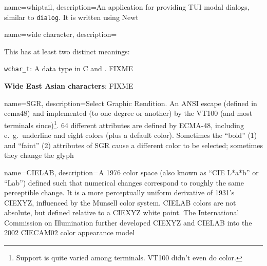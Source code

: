 {
  name={whiptail},
description={An application for providing TUI modal dialogs, similar to \texttt{dialog}. It is written using Newt}
}

{
  name={wide character},
  description={This has at least two distinct meanings:
\begin{denseitemize}
\item \texttt{wchar\_t}: A data type in C and \CC. FIXME
\item \textbf{Wide East Asian characters}: FIXME
\end{denseitemize}
}
}

{
  name={SGR},
    description={Select Graphic Rendition. An ANSI escape (defined in
      \Gls{ecma48}) and implemented (to one degree or another) by the
      VT100\cite{vt100} (and most terminals since)\footnote{Support is quite varied
      among terminals. VT100 didn't even do color.}. 64 different
      attributes are defined by ECMA-48, including e.\ g.\ underline and
      eight colors (plus a default color). Sometimes the ``bold'' (1) and
      ``faint'' (2) attributes of SGR cause a different color to be selected;
      sometimes they change the glyph}
}

{
  name={CIELAB},
  description={A 1976 color space (also known as ``CIE L*a*b'' or ``Lab'') defined such that
  numerical changes correspond to roughly the same perceptible change. It is
  a more perceptually uniform derivative of 1931's CIEXYZ, influenced by the
  Munsell color system. CIELAB colors are not absolute, but defined relative
  to a CIEXYZ white point. The International Commission on Illumination further
  developed CIEXYZ and CIELAB into the 2002 CIECAM02 color appearance model}
}
